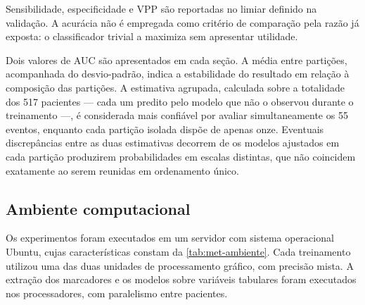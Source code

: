 Sensibilidade, especificidade e \gls{VPP} são reportadas no limiar definido
na validação. A acurácia não é empregada como critério de comparação pela
razão já exposta: o classificador trivial a maximiza sem apresentar
utilidade.

Dois valores de \gls{AUC} são apresentados em cada seção. A média entre
partições, acompanhada do desvio-padrão, indica a estabilidade do resultado
em relação à composição das partições. A estimativa agrupada, calculada sobre
a totalidade dos 517 pacientes --- cada um predito pelo modelo que não o
observou durante o treinamento ---, é considerada mais confiável por avaliar
simultaneamente os 55 eventos, enquanto cada partição isolada dispõe de
apenas onze. Eventuais discrepâncias entre as duas estimativas decorrem de os
modelos ajustados em cada partição produzirem probabilidades em escalas
distintas, que não coincidem exatamente ao serem reunidas em ordenamento
único.

\subsection{Ambiente computacional}
\label{subsec:met-ambiente}

Os experimentos foram executados em um servidor com sistema operacional
Ubuntu, cujas características constam da \autoref{tab:met-ambiente}. Cada
treinamento utilizou uma das duas unidades de processamento gráfico, com
precisão mista. A extração dos marcadores e os modelos sobre variáveis
tabulares foram executados nos processadores, com paralelismo entre
pacientes.

\begin{table}[h!]
	\captionsetup{width=14cm}
\end{table}

